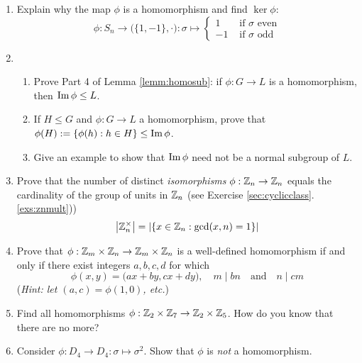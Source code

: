 \begin{exercises}{}{}
\begin{enumerate}
	
	
	
	\item Explain why the map $\phi$ is a homomorphism and find $\ker\phi$:
	\[\phi:S_n\to \bigl(\{1,-1\},\cdot\bigr):\sigma \mapsto \begin{cases}
  	1&\text{ if $\sigma$ even}\\
  	-1&\text{ if $\sigma$ odd}
	\end{cases}\]


	\item\begin{enumerate}
	  \item Prove Part 4 of Lemma \ref{lemm:homosub}: if $\phi:G\to L$ is a homomorphism, then $\operatorname{Im}\phi\le L$.
	 	\item If $H\le G$ and $\phi:G\to L$ a homomorphism, prove that $\phi(H):=\{\phi(h):h\in H\}\le\operatorname{Im}\phi$.
	  \item Give an example to show that $\operatorname{Im}\phi$ need not be a normal subgroup of $L$.
	\end{enumerate}

	
	\item\label{exs:totient} Prove that the number of distinct \emph{isomorphisms} $\phi:\mathbb{Z}_n\to\mathbb{Z}_n$ equals the cardinality of the group of units in $\mathbb{Z}_n$ (see Exercise \ref*{sec:cyclicclass}.\ref{exs:znmult}))
		\[\left| \mathbb{Z}_n^\times\right|=\left| \{x\in\mathbb{Z}_n:\gcd(x,n)=1\}\right|\]
		
		  
  \item Prove that $\phi:\mathbb{Z}_m\times\mathbb{Z}_n\to\mathbb{Z}_m\times\mathbb{Z}_n$ is a well-defined homomorphism if and only if there exist integers $a,b,c,d$ for which
  \[\phi(x,y)=\bigl(ax+by,cx+dy\bigr),\quad m\mid bn\quad\text{and}\quad n\mid cm\]
  (\emph{Hint: let $(a,c)=\phi(1,0)$, etc.})
  

	\item Find all homomorphisms $\phi:\mathbb{Z}_2\times\mathbb{Z}_7\to\mathbb{Z}_2\times\mathbb{Z}_5$. How do you know that there are no more?
	
	  
  \item Consider $\phi:D_4\to D_4:\sigma\mapsto \sigma^2$. Show that $\phi$ is \emph{not} a homomorphism.
	
\end{enumerate}

\end{exercises}

